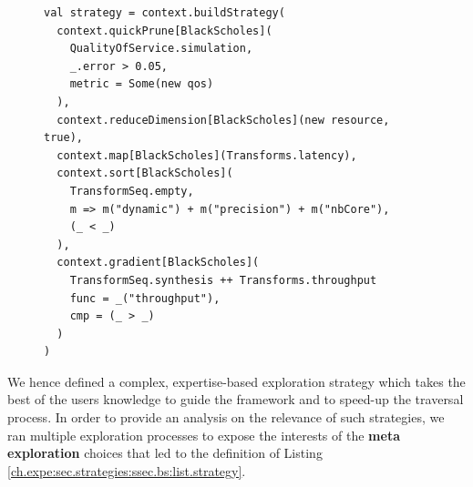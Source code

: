                 \begin{figure}[h!]
                    \begin{lstlisting}[xleftmargin=0mm,
                                       basewidth={0.55em, 0.5em},
                                       caption={[Black Scholes exploration strategy]Expertise-based exploration strategy for Black Scholes\newline implementations},
                                       label={ch.expe:sec.strategies:ssec.bs:list.strategy}]
val strategy = context.buildStrategy(                                                                                    
  context.quickPrune[BlackScholes](                                                                             
    QualityOfService.simulation,
    _.error > 0.05,                                                                                            
    metric = Some(new qos)                                                                              
  ),                                                                                                                
  context.reduceDimension[BlackScholes](new resource, true),                                                    
  context.map[BlackScholes](Transforms.latency),                                                     
  context.sort[BlackScholes](                                                                                   
    TransformSeq.empty,                                                                                           
    m => m("dynamic") + m("precision") + m("nbCore"),                                                                 
    (_ < _)                                                                                                           
  ),                                                                                                                  
  context.gradient[BlackScholes](                                                                               
    TransformSeq.synthesis ++ Transforms.throughput
    func = _("throughput"),                                                                                           
    cmp = (_ > _)  
  )                                    
)\end{lstlisting}
                \end{figure}

                We hence defined a complex, expertise-based exploration strategy which takes the best of the users knowledge to guide the framework and to speed-up the traversal process.
                In order to provide an analysis on the relevance of such strategies, we ran multiple exploration processes to expose the interests of the {\bf meta exploration} choices that led to the definition of Listing \ref{ch.expe:sec.strategies:ssec.bs:list.strategy}.
                
